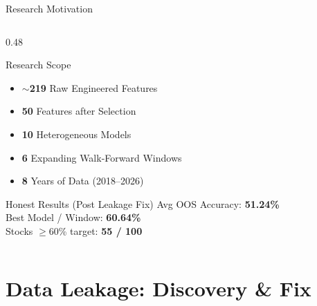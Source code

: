 \documentclass[aspectratio=43,11pt]{beamer}
\begin{document}
\begin{frame}{Research Motivation}
\begin{columns}[T]
\begin{column}{0.48\textwidth}
\begin{block}{Research Scope}
\begin{itemize}
                    \item \textbf{$\sim$219} Raw Engineered Features
                    \item \textbf{50} Features after Selection
                    \item \textbf{10} Heterogeneous Models
                    \item \textbf{6} Expanding Walk-Forward Windows
                    \item \textbf{8} Years of Data (2018--2026)
                \end{itemize}
            \end{block}
            \begin{exampleblock}{Honest Results (Post Leakage Fix)}
                \footnotesize
                Avg OOS Accuracy: \textbf{51.24\%} \\
                Best Model / Window: \textbf{60.64\%} \\
                Stocks $\geq$60\% target: \textbf{55 / 100}
            \end{exampleblock}
        \end{column}
    \end{columns}
\end{frame}

\section{Data Leakage: Discovery \& Fix}
\end{document}
